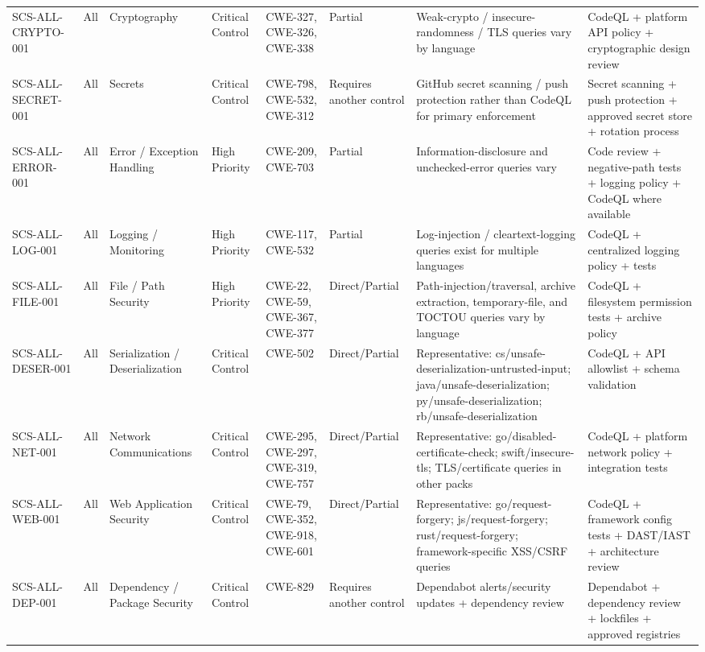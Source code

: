 \documentclass[10pt,letterpaper]{article}
\begin{document}
\begin{landscape}
\begin{longtable}{@{}P{1.0in}P{0.6in}P{0.95in}P{0.75in}P{0.85in}P{0.75in}P{2.0in}P{2.05in}@{}}
SCS-ALL-CRYPTO-001 & All & Cryptography & Critical Control & CWE-327, CWE-326, CWE-338 & Partial & Weak-crypto / insecure-randomness / TLS queries vary by language & CodeQL + platform API policy + cryptographic design review\\
SCS-ALL-SECRET-001 & All & Secrets & Critical Control & CWE-798, CWE-532, CWE-312 & Requires another control & GitHub secret scanning / push protection rather than CodeQL for primary enforcement & Secret scanning + push protection + approved secret store + rotation process\\
SCS-ALL-ERROR-001 & All & Error / Exception Handling & High Priority & CWE-209, CWE-703 & Partial & Information-disclosure and unchecked-error queries vary & Code review + negative-path tests + logging policy + CodeQL where available\\
SCS-ALL-LOG-001 & All & Logging / Monitoring & High Priority & CWE-117, CWE-532 & Partial & Log-injection / cleartext-logging queries exist for multiple languages & CodeQL + centralized logging policy + tests\\
SCS-ALL-FILE-001 & All & File / Path Security & High Priority & CWE-22, CWE-59, CWE-367, CWE-377 & Direct/Partial & Path-injection/traversal, archive extraction, temporary-file, and TOCTOU queries vary by language & CodeQL + filesystem permission tests + archive policy\\
SCS-ALL-DESER-001 & All & Serialization / Deserialization & Critical Control & CWE-502 & Direct/Partial & Representative: cs/unsafe-deserialization-untrusted-input; java/unsafe-deserialization; py/unsafe-deserialization; rb/unsafe-deserialization & CodeQL + API allowlist + schema validation\\
SCS-ALL-NET-001 & All & Network Communications & Critical Control & CWE-295, CWE-297, CWE-319, CWE-757 & Direct/Partial & Representative: go/disabled-certificate-check; swift/insecure-tls; TLS/certificate queries in other packs & CodeQL + platform network policy + integration tests\\
SCS-ALL-WEB-001 & All & Web Application Security & Critical Control & CWE-79, CWE-352, CWE-918, CWE-601 & Direct/Partial & Representative: go/request-forgery; js/request-forgery; rust/request-forgery; framework-specific XSS/CSRF queries & CodeQL + framework config tests + DAST/IAST + architecture review\\
SCS-ALL-DEP-001 & All & Dependency / Package Security & Critical Control & CWE-829 & Requires another control & Dependabot alerts/security updates + dependency review & Dependabot + dependency review + lockfiles + approved registries\\

\end{longtable}
\end{landscape}
\end{document}
